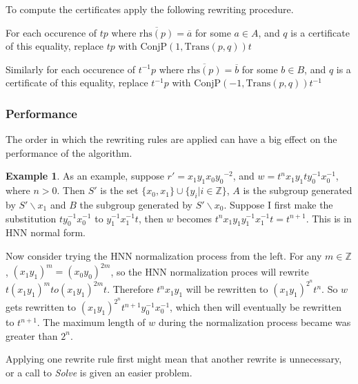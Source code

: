 \documentclass[11pt]{article} %
\theoremstyle{definition}
\theoremstyle{definition}
\theoremstyle{definition}
\theoremstyle{definition}
\theoremstyle{definition}
\theoremstyle{definition}
\newtheorem{exmpl}{Example}[theorem]
\begin{document}
To compute the certificates apply the following rewriting procedure.

For each occurence of $tp$ where $\overline{\text{rhs}(p)} = \overline{a}$ for
some $a \in A$, and $q$ is a certificate of this equality,
replace $tp$ with $\text{ConjP}(1, \text{Trans}(p, q))t$

Similarly for each occurence of $t^{-1}p$ where $\overline{\text{rhs}(p)} = \overline{b}$ for
some $b \in B$, and $q$ is a certificate of this equality,
replace $t^{-1}p$ with $\text{ConjP}(-1, \text{Trans}(p, q))t^{-1}$

\subsubsection{Performance}

The order in which the rewriting rules are applied can have a big effect on the performance
of the algorithm.

\begin{exmpl}\label{ltrbad}
As an example, suppose $r' = {x_1y_1}{x_0y_0}^{-2}$, and
$w = t^n x_1y_1 t y_0^{-1}x_0^{-1}$, where $n > 0$.
Then $S'$ is the set $\{x_0, x_1\} \cup \{y_i | i \in \mathbb{Z}\}$,
$A$ is the subgroup generated by $S' \backslash x_1$ and
$B$ the subgroup generated by $S' \backslash x_0$.
Suppose I first make the substitution $ty_0^{-1}x_0^{-1}$ to $y_1^{-1}x_1^{-1} t$,
then $w$ becomes $t^{n}x_1y_1y_1^{-1}x_1^{-1}t = t^{n+1}$.
This is in HNN normal form.

Now consider trying the HNN normalization process from the left.
For any $m \in \mathbb{Z}$, $(x_1y_1)^m = (x_0y_0)^{2m}$,
so the HNN normalization proces will rewrite $t(x_1y_1)^m to (x_1y_1)^{2m}t$.
Therefore $t^nx_1y_1$ will be rewritten to $(x_1y_1)^{2^n}t^n$.
So $w$ gets rewritten to $(x_1y_1)^{2^n} t^{n+1} y_0^{-1}x_0^{-1}$,
which then will eventually be rewritten to $t^{n+1}$. The maximum length
of $w$ during the normalization process became was greater than $2^n$.
\end{exmpl}

Applying one rewrite rule first
might mean that another rewrite is unnecessary, or a call to \textit{Solve} is
given an easier problem.
\end{document}
